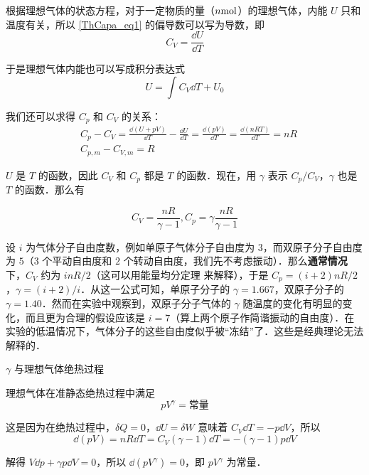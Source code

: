 根据理想气体的状态方程，对于一定物质的量（$n \rm{mol}$）的理想气体，内能 $U$ 只和温度有关，所以 \autoref{ThCapa_eq1} 的偏导数可以写为导数，即
\begin{equation}
C_V=\frac{\dd U}{\dd T}
\end{equation}

于是理想气体内能也可以写成积分表达式
\begin{equation}
U=\int C_V\dd T + U_0
\end{equation}

我们还可以求得 $C_p$ 和 $C_V$ 的关系：
\begin{align}
&C_p-C_V=\frac{\dd (U+pV)}{\dd T}-\frac{\dd U}{\dd T}=\frac{\dd(pV)}{\dd T}=\frac{\dd (nRT)}{\dd T}=nR\\
&C_{p,m}-C_{V,m}=R
\end{align}

$U$ 是 $T$ 的函数，因此 $C_V$ 和 $C_p$ 都是 $T$ 的函数．现在，用 $\gamma$ 表示 $C_p/C_V$，$\gamma$ 也是 $T$ 的函数．那么有

\begin{equation}
C_V=\frac{nR}{\gamma-1},C_p=\gamma\frac{nR}{\gamma-1}
\end{equation}

设 $i$ 为气体分子自由度数，例如单原子气体分子自由度为 $3$，而双原子分子自由度为 $5$（$3$ 个平动自由度和 $2$ 个转动自由度，我们先不考虑振动）．那么\textbf{通常情况}下，$C_V$ 约为 $inR/2$（这可以用能量均分定理 来解释），于是 $C_p=(i+2)nR/2$，$\gamma=(i+2)/i$．从这一公式可知，单原子分子的 $\gamma=1.667$，双原子分子的 $\gamma=1.40$．然而在实验中观察到，双原子分子气体的 $\gamma$ 随温度的变化有明显的变化，而且更为合理的假设应该是 $i=7$（算上两个原子作简谐振动的自由度）．在实验的低温情况下，气体分子的这些自由度似乎被“冻结”了．这些是经典理论无法解释的．
\begin{example}{$\gamma$ 与理想气体绝热过程}

理想气体在准静态绝热过程中满足
\begin{equation}
pV^{\gamma}=\text{常量}
\end{equation}

这是因为在绝热过程中，$\delta{Q}=0$，$\dd{U}=\delta{W}$ 意味着 $C_V\dd{T}=-p\dd{V}$，所以
\begin{equation}
\dd(pV)=nR\dd{T}=C_V(\gamma-1)\dd{T}=-(\gamma-1)p\dd{V}
\end{equation}

解得 $V\dd{p}+\gamma p\dd{V} = 0$，所以 $\dd{(pV^\gamma)}=0$，即 $pV^{\gamma}$ 为常量．
\end{example}

